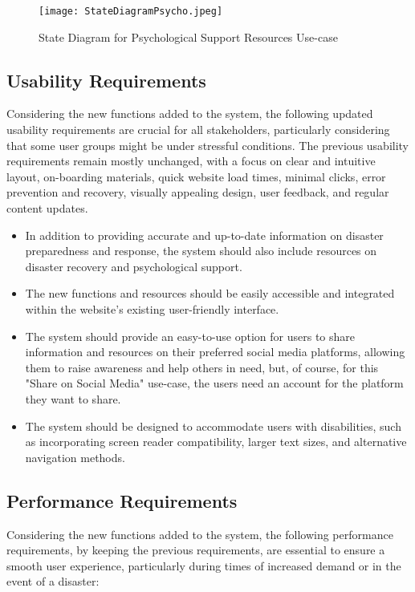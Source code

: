 \documentclass[11pt,a4paper]{article}
\begin{document}
\begin{figure}[H]
    \centering
    \texttt{[image: StateDiagramPsycho.jpeg]}
    \caption{State Diagram for Psychological Support Resources Use-case}
    \label{State Diagram for Psychological Support Resources Use-case}
\end{figure}

\newpage

\subsection{Usability Requirements}
Considering the new functions added to the system, the following updated usability requirements are crucial for all stakeholders, particularly considering that some user groups might be under stressful conditions. The previous usability requirements remain mostly unchanged, with a focus on clear and intuitive layout, on-boarding materials, quick website load times, minimal clicks, error prevention and recovery, visually appealing design, user feedback, and regular content updates.

\begin{itemize}
    \item In addition to providing accurate and up-to-date information on disaster preparedness and response, the system should also include resources on disaster recovery and psychological support.
    \item The new functions and resources should be easily accessible and integrated within the website's existing user-friendly interface.
    \item The system should provide an easy-to-use option for users to share information and resources on their preferred social media platforms, allowing them to raise awareness and help others in need, but, of course, for this "Share on Social Media" use-case, the users need an account for the platform they want to share.
    \item The system should be designed to accommodate users with disabilities, such as incorporating screen reader compatibility, larger text sizes, and alternative navigation methods.
\end{itemize}

\subsection{Performance Requirements}
Considering the new functions added to the system, the following performance requirements, by keeping the previous requirements, are essential to ensure a smooth user experience, particularly during times of increased demand or in the event of a disaster:
\end{document}
